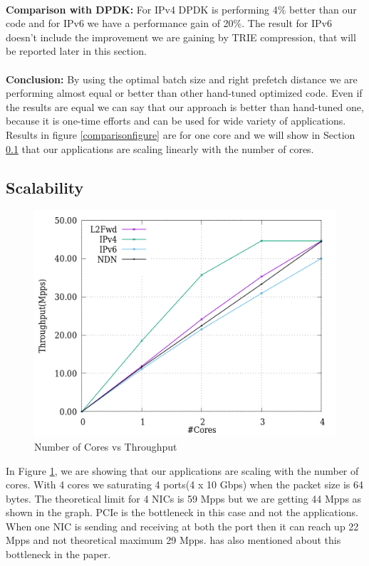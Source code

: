 \\
\textbf{Comparison with DPDK\cite{DPDK}:} For IPv4 DPDK is performing 4\% better than our code and for IPv6 we have a performance gain of 20\%. The result for IPv6 doesn't include the improvement we are gaining by TRIE compression, that will be reported later in this section. 
\\
\\
\textbf{Conclusion:} By using the optimal batch size and right prefetch distance we are performing almost equal or better than other hand-tuned optimized code. Even if the results are equal we can say that our approach is better than hand-tuned one, because it is one-time efforts and can be used for wide variety of applications. Results in figure \ref{comparisonfigure} are for one core and we will show in Section \ref{scalability} that our applications are scaling linearly with the number of cores.


\subsection{Scalability}
\label{scalability}
\begin{figure}[ht]
\includegraphics[width = \linewidth]{Figures/cores.png}
\caption{Number of Cores vs Throughput}
\label{cores}
\end{figure}
In Figure \ref{cores}, we are showing that our applications are scaling with the number of cores. With 4 cores we saturating 4 ports(4 x 10 Gbps) when the packet size is 64 bytes.
The theoretical limit for 4 NICs is 59 Mpps but we are getting 44 Mpps as shown in the graph. PCIe is the bottleneck in this case and not the applications. When one NIC is sending and receiving at both the port then it can reach up 22 Mpps and not theoretical maximum 29 Mpps. \cite{Zhou:2013:SHP:2535372.2535379} has also mentioned about this bottleneck in the paper.

